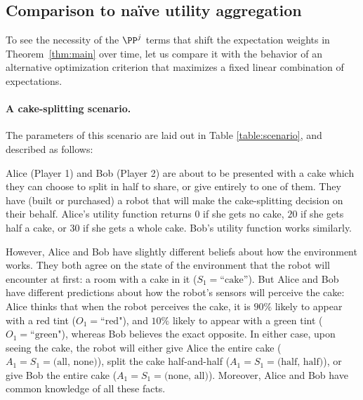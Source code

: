 \documentclass{article}  %
\newcommand{\thm}[1]{Theorem~\ref{thm:#1}}
\begin{document}
\subsection{Comparison to na\"{i}ve utility aggregation}\label{sec:comparison}

To see the necessity of the $\PP^j$ terms that shift the expectation weights in \thm{main} over time, let us compare it with the behavior of an alternative optimization criterion that maximizes a fixed linear combination of expectations.

\paragraph{A cake-splitting scenario.}  The parameters of this scenario are laid out in Table \ref{table:scenario}, and described as follows:

Alice (Player 1) and Bob (Player 2) are about to be presented with a cake which they can choose to split in half to share, or give entirely to one of them.  They have (built or purchased) a robot that will make the cake-splitting decision on their behalf.  Alice's utility function returns $0$ if she gets no cake, $20$ if she gets half a cake, or $30$ if she gets a whole cake.  Bob's utility function works similarly.  

However, Alice and Bob have slightly different beliefs about how the environment works.  They both agree on the state of the environment that the robot will encounter at first: a room with a cake in it ($S_1=\text{``cake''}$).  But Alice and Bob have different predictions about how the robot's sensors will perceive the cake: Alice thinks that when the robot perceives the cake, it is $90\%$ likely to appear with a red tint ($O_1=\text{``red"}$), and $10\%$ likely to appear with a green tint ($O_1=\text{``green"}$), whereas Bob believes the exact opposite.  In either case, upon seeing the cake, the robot will either give Alice the entire cake ($A_1=S_1=\text{(all, none)}$), split the cake half-and-half ($A_1=S_1=\text{(half, half)}$), or give Bob the entire cake ($A_1=S_1=\text{(none, all)}$).  Moreover, Alice and Bob have common knowledge of all these facts.
\end{document}
